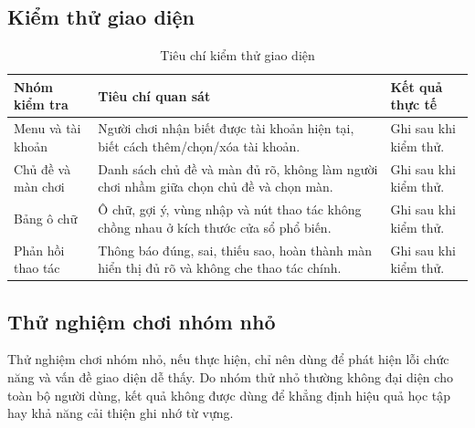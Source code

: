 \documentclass[../DoAn.tex]{subfiles}
\begin{document}
\subsection{Kiểm thử giao diện}

\begin{table}[H]
\centering
\small
\begin{tabularx}{\textwidth}{|>{\RaggedRight\arraybackslash}p{3.0cm}|>{\RaggedRight\arraybackslash}X|>{\RaggedRight\arraybackslash}p{3.2cm}|}
\hline
\textbf{Nhóm kiểm tra} & \textbf{Tiêu chí quan sát} & \textbf{Kết quả thực tế} \\ \hline
Menu và tài khoản & Người chơi nhận biết được tài khoản hiện tại, biết cách thêm/chọn/xóa tài khoản. & Ghi sau khi kiểm thử. \\ \hline
Chủ đề và màn chơi & Danh sách chủ đề và màn đủ rõ, không làm người chơi nhầm giữa chọn chủ đề và chọn màn. & Ghi sau khi kiểm thử. \\ \hline
Bảng ô chữ & Ô chữ, gợi ý, vùng nhập và nút thao tác không chồng nhau ở kích thước cửa sổ phổ biến. & Ghi sau khi kiểm thử. \\ \hline
Phản hồi thao tác & Thông báo đúng, sai, thiếu sao, hoàn thành màn hiển thị đủ rõ và không che thao tác chính. & Ghi sau khi kiểm thử. \\ \hline
\end{tabularx}
\caption{Tiêu chí kiểm thử giao diện}
\label{table:ui_test_criteria}
\end{table}

\subsection{Thử nghiệm chơi nhóm nhỏ}

Thử nghiệm chơi nhóm nhỏ, nếu thực hiện, chỉ nên dùng để phát hiện lỗi chức năng và vấn đề giao diện dễ thấy. Do nhóm thử nhỏ thường không đại diện cho toàn bộ người dùng, kết quả không được dùng để khẳng định hiệu quả học tập hay khả năng cải thiện ghi nhớ từ vựng.
\end{document}

